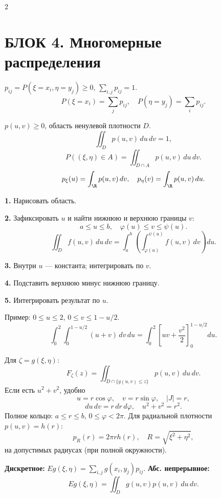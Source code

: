 \documentclass[a4paper,10pt]{article}
\newcommand{\blk}[2]{\section{БЛОК #1. #2}}
\begin{document}
\begin{multicols}{2}
\raggedcolumns
\blk{4}{Многомерные распределения}
\begin{definition}
$p_{ij}=P(\xi=x_i,\eta=y_j)\ge0$, $\sum_{i,j}p_{ij}=1$.
\[
P(\xi=x_i)=\sum_jp_{ij},\quad P(\eta=y_j)=\sum_ip_{ij}.
\]
\end{definition}

\begin{definition}
$p(u,v)\ge0$, область ненулевой плотности $D$.
\[
\iint_Dp(u,v)\,du\,dv=1,
\]
\[
P((\xi,\eta)\in A)=\iint_{D\cap A}p(u,v)\,du\,dv.
\]
\[
p_\xi(u)=\int_\R p(u,v)\,dv,\quad p_\eta(v)=\int_\R p(u,v)\,du.
\]
\end{definition}
\begin{hint}
\par\textbf{1.} Нарисовать область. \par\textbf{2.} Зафиксировать $u$ и найти нижнюю и верхнюю границы $v$:
\[
a\le u\le b,\quad\varphi(u)\le v\le\psi(u).
\]
\[
\iint_D f(u,v)\,du\,dv
=\int_a^b\left(\int_{\varphi(u)}^{\psi(u)}f(u,v)\,dv\right)du.
\]
\par\textbf{3.} Внутри $u$ --- константа; интегрировать по $v$.
\par\textbf{4.} Подставить верхнюю минус нижнюю границу.
\par\textbf{5.} Интегрировать результат по $u$.

Пример: $0\le u\le2$, $0\le v\le1-u/2$.
\[
\int_0^2\!\int_0^{1-u/2}(u+v)\,dv\,du
=\int_0^2\left[uv+\frac{v^2}{2}\right]_0^{1-u/2}du.
\]

\end{hint}
\begin{hint}
Для $\zeta=g(\xi,\eta)$:
\[
F_\zeta(z)=\iint_{D\cap\{g(u,v)\le z\}}p(u,v)\,du\,dv.
\]
Если есть $u^2+v^2$, удобно
\[
u=r\cos\varphi,\quad v=r\sin\varphi,\quad |J|=r,
\]
\[
du\,dv=r\,dr\,d\varphi,\quad u^2+v^2=r^2.
\]
Полное кольцо: $a\le r\le b$, $0\le\varphi<2\pi$.
Для радиальной плотности $p(u,v)=h(r)$:
\[
p_R(r)=2\pi r h(r),\quad R=\sqrt{\xi^2+\eta^2},
\]
на допустимых радиусах (при полной окружности).
\end{hint}
\begin{theorem}
\textbf{Дискретное:} $Eg(\xi,\eta)=\sum_{i,j}g(x_i,y_j)p_{ij}$.
\textbf{Абс. непрерывное:}
\[
Eg(\xi,\eta)=\iint_Dg(u,v)p(u,v)\,du\,dv.
\]
\end{theorem}
\columnbreak


\end{multicols}
\end{document}
